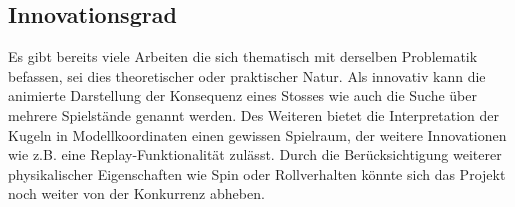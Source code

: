 \subsection{Innovationsgrad}
Es gibt bereits viele Arbeiten die sich thematisch mit derselben Problematik befassen, sei dies theoretischer oder
praktischer Natur. Als innovativ kann die animierte Darstellung der Konsequenz eines Stosses wie auch die Suche über
mehrere Spielstände genannt werden. Des Weiteren bietet die Interpretation der Kugeln in Modellkoordinaten einen gewissen Spielraum,
der weitere Innovationen wie z.B. eine Replay-Funktionalität zulässt. Durch die Berücksichtigung weiterer physikalischer
Eigenschaften wie Spin oder Rollverhalten könnte sich das Projekt noch weiter von der Konkurrenz abheben.
